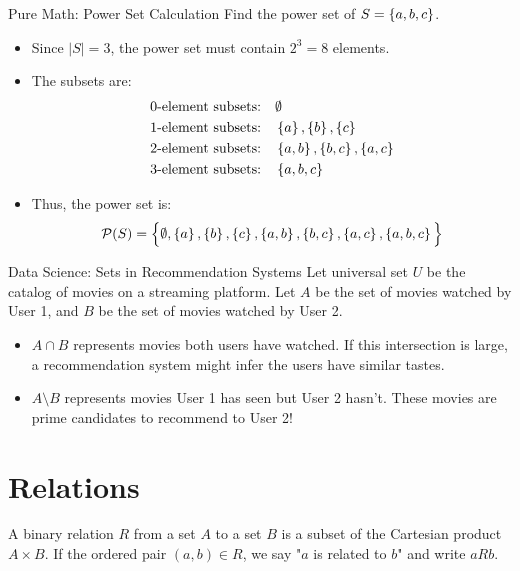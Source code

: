 \begin{examplebox}{Pure Math: Power Set Calculation}
Find the power set of $S = \left\{a, b, c\right\}$.
\begin{itemize}
    \item Since $|S| = 3$, the power set must contain $2^3 = 8$ elements.
    \item The subsets are:
    \begin{align*}
        \text{0-element subsets:} & \quad \emptyset \\
        \text{1-element subsets:} & \quad \left\{a\right\}, \left\{b\right\}, \left\{c\right\} \\
        \text{2-element subsets:} & \quad \left\{a,b\right\}, \left\{b,c\right\}, \left\{a,c\right\} \\
        \text{3-element subsets:} & \quad \left\{a,b,c\right\}
    \end{align*}
    \item Thus, the power set is:
    $$\mathcal{P}(S) = \Big\{ \emptyset, \left\{a\right\}, \left\{b\right\}, \left\{c\right\}, \left\{a,b\right\}, \left\{b,c\right\}, \left\{a,c\right\}, \left\{a,b,c\right\} \Big\}$$
\end{itemize}
\end{examplebox}

\begin{examplebox}{Data Science: Sets in Recommendation Systems}
Let universal set $U$ be the catalog of movies on a streaming platform. Let $A$ be the set of movies watched by User 1, and $B$ be the set of movies watched by User 2. 
\begin{itemize}
    \item $A \cap B$ represents movies both users have watched. If this intersection is large, a recommendation system might infer the users have similar tastes.
    \item $A \setminus B$ represents movies User 1 has seen but User 2 hasn't. These movies are prime candidates to recommend to User 2!
\end{itemize}
\end{examplebox}

\section{Relations}

A binary relation $R$ from a set $A$ to a set $B$ is a subset of the Cartesian product $A \times B$. If the ordered pair $(a, b) \in R$, we say "$a$ is related to $b$" and write $a R b$. 

